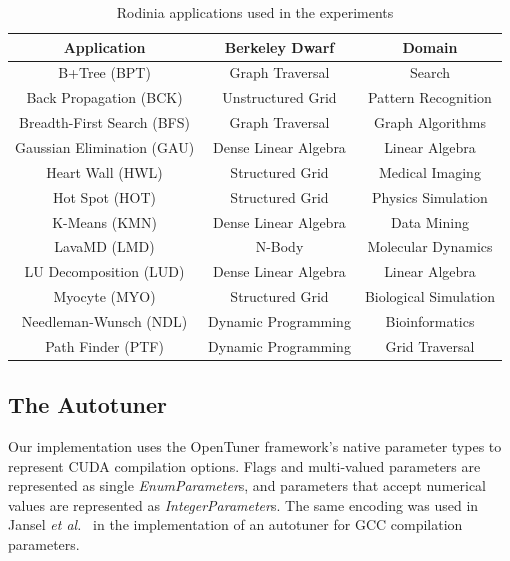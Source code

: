 \begin{table}[htpb]
    \centering
    \footnotesize
        \begin{tabular}{ccc}
            \toprule
            \textbf{Application} & \textbf{Berkeley Dwarf\cite{asanovic2009view}} & \textbf{Domain} \\\midrule
            B+Tree (BPT) & Graph Traversal& Search \\\midrule
            Back Propagation (BCK) & Unstructured Grid & Pattern Recognition \\\midrule
            Breadth-First Search (BFS) & Graph Traversal & Graph Algorithms \\\midrule
            Gaussian Elimination (GAU) & Dense Linear Algebra & Linear Algebra \\\midrule
            Heart Wall (HWL) & Structured Grid & Medical Imaging \\\midrule
            Hot Spot (HOT) & Structured Grid & Physics Simulation \\\midrule
            K-Means (KMN) & Dense Linear Algebra & Data Mining \\\midrule
            LavaMD (LMD) & N-Body & Molecular Dynamics \\\midrule
            LU Decomposition (LUD) & Dense Linear Algebra & Linear Algebra \\\midrule
            Myocyte (MYO) & Structured Grid & Biological Simulation \\\midrule
            Needleman-Wunsch (NDL) & Dynamic Programming & Bioinformatics \\\midrule
            Path Finder (PTF) & Dynamic Programming & Grid Traversal \\\bottomrule
        \end{tabular}
    \caption{Rodinia applications used in the experiments}
    \label{tab:Rodinia}
\end{table}

\subsection{The Autotuner}
\label{sec:tuner}

Our implementation uses the OpenTuner framework's native parameter types to
represent CUDA compilation options. Flags and multi-valued parameters are
represented as single \emph{EnumParameter}s, and parameters that accept
numerical values are represented as \emph{IntegerParameter}s.  The same
encoding was used in Jansel \emph{et al.}~\cite{ansel2014opentuner} in the
implementation of an autotuner for GCC compilation parameters.

